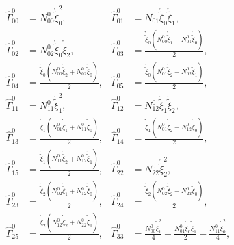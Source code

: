 \begin{equation}\begin{aligned}
\widehat{\Gamma}^{0}_{00} &= N^{0}_{00} \mathring{\widetilde{\xi}}_0^{2}, & 
\widehat{\Gamma}^{0}_{01} &= N^{0}_{01} \mathring{\widetilde{\xi}}_0 \mathring{\widetilde{\xi}}_1,\\[1ex]
\widehat{\Gamma}^{0}_{02} &= N^{0}_{02} \mathring{\widetilde{\xi}}_0 \mathring{\widetilde{\xi}}_2, & 
\widehat{\Gamma}^{0}_{03} &= \frac{\mathring{\widetilde{\xi}}_0 \left(N^{0}_{00} \mathring{\widetilde{\xi}}_1 + N^{0}_{01} \mathring{\widetilde{\xi}}_0\right)}{2},\\[1ex]
\widehat{\Gamma}^{0}_{04} &= \frac{\mathring{\widetilde{\xi}}_0 \left(N^{0}_{00} \mathring{\widetilde{\xi}}_2 + N^{0}_{02} \mathring{\widetilde{\xi}}_0\right)}{2}, & 
\widehat{\Gamma}^{0}_{05} &= \frac{\mathring{\widetilde{\xi}}_0 \left(N^{0}_{01} \mathring{\widetilde{\xi}}_2 + N^{0}_{02} \mathring{\widetilde{\xi}}_1\right)}{2},\\[1ex]
\widehat{\Gamma}^{0}_{11} &= N^{0}_{11} \mathring{\widetilde{\xi}}_1^{2}, & 
\widehat{\Gamma}^{0}_{12} &= N^{0}_{12} \mathring{\widetilde{\xi}}_1 \mathring{\widetilde{\xi}}_2,\\[1ex]
\widehat{\Gamma}^{0}_{13} &= \frac{\mathring{\widetilde{\xi}}_1 \left(N^{0}_{01} \mathring{\widetilde{\xi}}_1 + N^{0}_{11} \mathring{\widetilde{\xi}}_0\right)}{2}, & 
\widehat{\Gamma}^{0}_{14} &= \frac{\mathring{\widetilde{\xi}}_1 \left(N^{0}_{01} \mathring{\widetilde{\xi}}_2 + N^{0}_{12} \mathring{\widetilde{\xi}}_0\right)}{2},\\[1ex]
\widehat{\Gamma}^{0}_{15} &= \frac{\mathring{\widetilde{\xi}}_1 \left(N^{0}_{11} \mathring{\widetilde{\xi}}_2 + N^{0}_{12} \mathring{\widetilde{\xi}}_1\right)}{2}, & 
\widehat{\Gamma}^{0}_{22} &= N^{0}_{22} \mathring{\widetilde{\xi}}_2^{2},\\[1ex]
\widehat{\Gamma}^{0}_{23} &= \frac{\mathring{\widetilde{\xi}}_2 \left(N^{0}_{02} \mathring{\widetilde{\xi}}_1 + N^{0}_{12} \mathring{\widetilde{\xi}}_0\right)}{2}, & 
\widehat{\Gamma}^{0}_{24} &= \frac{\mathring{\widetilde{\xi}}_2 \left(N^{0}_{02} \mathring{\widetilde{\xi}}_2 + N^{0}_{22} \mathring{\widetilde{\xi}}_0\right)}{2},\\[1ex]
\widehat{\Gamma}^{0}_{25} &= \frac{\mathring{\widetilde{\xi}}_2 \left(N^{0}_{12} \mathring{\widetilde{\xi}}_2 + N^{0}_{22} \mathring{\widetilde{\xi}}_1\right)}{2}, & 
\widehat{\Gamma}^{0}_{33} &= \frac{N^{0}_{00} \mathring{\widetilde{\xi}}_1^{2}}{4} + \frac{N^{0}_{01} \mathring{\widetilde{\xi}}_0 \mathring{\widetilde{\xi}}_1}{2} + \frac{N^{0}_{11} \mathring{\widetilde{\xi}}_0^{2}}{4},\\[1ex]

\end{aligned}
\end{equation}
